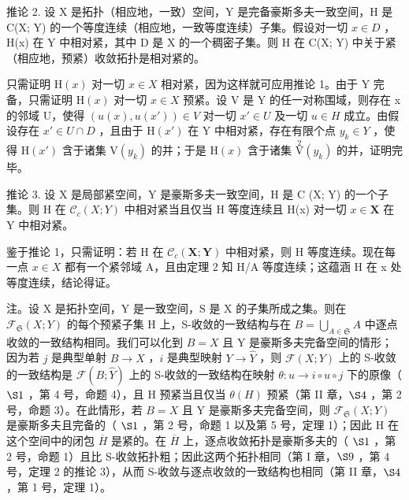 推论 2. 设 X 是拓扑（相应地，一致）空间，Y 是完备豪斯多夫一致空间，H 是 C(X; Y) 的一个等度连续（相应地，一致等度连续）子集。假设对一切 \(x \in D\) ，H(x) 在 Y 中相对紧，其中 D 是 X 的一个稠密子集。则 H 在 C(X; Y) 中关于紧（相应地，预紧）收敛拓扑是相对紧的。

只需证明 \(\mathrm{H}(x)\) 对一切 \(x \in X\) 相对紧，因为这样就可应用推论 1。由于 Y 完备，只需证明 \(\mathrm{H}(x)\) 对一切 \(x \in X\) 预紧。设 V 是 Y 的任一对称围域，则存在 x 的邻域 U，使得 \((u(x), u(x')) \in V\) 对一切 \(x' \in U\) 及一切 \(u \in H\) 成立。由假设存在 \(x' \in U \cap D\) ，且由于 \(\mathrm{H}(x')\) 在 Y 中相对紧，存在有限个点 \(y_k \in Y\) ，使得 \(\mathrm{H}(x')\) 含于诸集 \(\mathrm{V}(y_k)\) 的并；于是 \(\mathrm{H}(x)\) 含于诸集 \(\overset{2}{\mathrm{V}}(y_k)\) 的并，证明完毕。

推论 3. 设 X 是局部紧空间，Y 是豪斯多夫一致空间，H 是 C (X; Y) 的一个子集。则 H 在 \(\mathcal{C}_c(X; Y)\) 中相对紧当且仅当 H 等度连续且 H(x) 对一切 \(x \in \mathbf{X}\) 在 Y 中相对紧。

鉴于推论 1，只需证明：若 H 在 \(\mathcal{C}_{c}(\mathbf{X};\mathbf{Y})\) 中相对紧，则 H 等度连续。现在每一点 \(x\in X\) 都有一个紧邻域 A，且由定理 2 知 H/A 等度连续；这蕴涵 H 在 x 处等度连续，结论得证。

注。设 X 是拓扑空间，Y 是一致空间，S 是 X 的子集所成之集。则在 \(\mathcal{F}_{\mathfrak{S}}(X;Y)\) 的每个预紧子集 H 上，S-收敛的一致结构与在 \(B = \bigcup_{A \in \mathfrak{S}} A\) 中逐点收敛的一致结构相同。我们可以化到 \(B = X\) 且 Y 是豪斯多夫完备空间的情形；因为若 \(j\) 是典型单射 \(B \to X\) ，\(i\) 是典型映射 \(Y \to \hat{Y}\) ，则 \(\mathcal{F}(X;Y)\) 上的 S-收敛的一致结构是 \(\mathcal{F}(B;\hat{Y})\) 上的 S-收敛的一致结构在映射 \(\theta : u \to i \circ u \circ j\) 下的原像（ \(\S 1\) ，第 4 号，命题 4），且 H 预紧当且仅当 \(\theta(H)\) 预紧（第 II 章，\(\S 4\) ，第 2 号，命题 3）。在此情形，若 \(B = X\) 且 Y 是豪斯多夫完备空间，则 \(\mathcal{F}_{\mathfrak{S}}(X;Y)\) 是豪斯多夫且完备的（ \(\S 1\) ，第 2 号，命题 1 以及第 5 号，定理 1）；因此 H 在这个空间中的闭包 \(\overline{H}\) 是紧的。在 \(\overline{H}\) 上，逐点收敛拓扑是豪斯多夫的（ \(\S 1\) ，第 2 号，命题 1）且比 S-收敛拓扑粗；因此这两个拓扑相同（第 I 章，\(\S 9\) ，第 4 号，定理 2 的推论 3），从而 S-收敛与逐点收敛的一致结构也相同（第 II 章，\(\S 4\) ，第 1 号，定理 1）。

